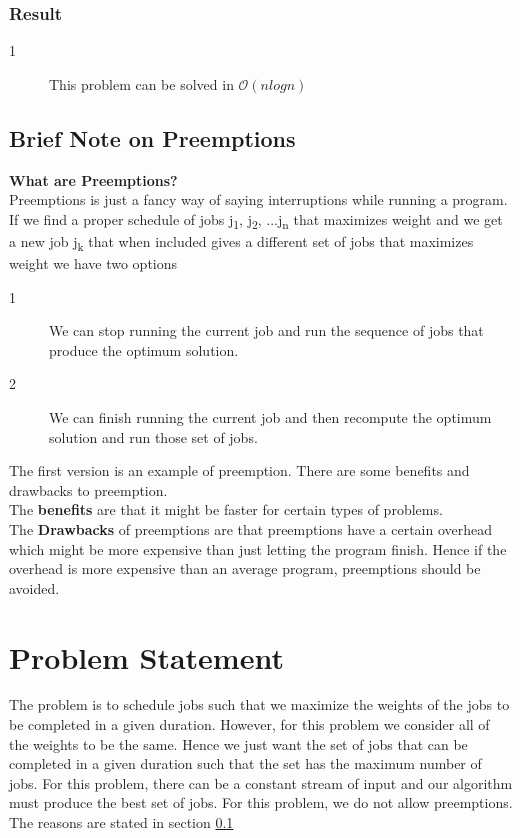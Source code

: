 \documentclass[11pt]{article}
\begin{document}
{				\subsubsection{Result}
				\begin{description}
					\item[1] This problem can be solved in $\mathcal{O}(nlogn)$ \citet{doi:10.1287/mnsc.15.1.102}
				\end{description}
				
				\subsection{Brief Note on Preemptions}
				\label{bnop}
				\textbf{What are Preemptions?} \\Preemptions is just a fancy way of saying interruptions while running a program. If we find a proper schedule of jobs j\textsubscript{1}, j\textsubscript{2}, ...j\textsubscript{n} that maximizes weight and we get a new job j\textsubscript{k} that when included gives a different set of jobs that maximizes weight we have two options
				\begin{description}
					\item[1] We can stop running the current job and run the sequence of jobs that produce the optimum solution.
					\item[2] We can finish running the current job and then recompute the optimum solution and run those set of jobs.
				\end{description}
				The first version is an example of preemption. There are some benefits and drawbacks to preemption.\\
				The \textbf{benefits} are that it might be faster for certain types of problems.\\
				The \textbf{Drawbacks} of preemptions are that preemptions have a certain overhead which might be more expensive than just letting the program finish. Hence if the overhead is more expensive than an average program, preemptions should be avoided.
				
				\section{Problem Statement}
				The problem is to schedule jobs such that we maximize the weights of the jobs to be completed in a given duration. However, for this problem we consider all of the weights to be the same. Hence we just want the set of jobs that can be completed in a given duration such that the set has the maximum number of jobs. For this problem, there can be a constant stream of input and our algorithm must produce the best set of jobs. For this problem, we do not allow preemptions. The reasons are stated in section \ref{bnop}
				
}
\end{document}

